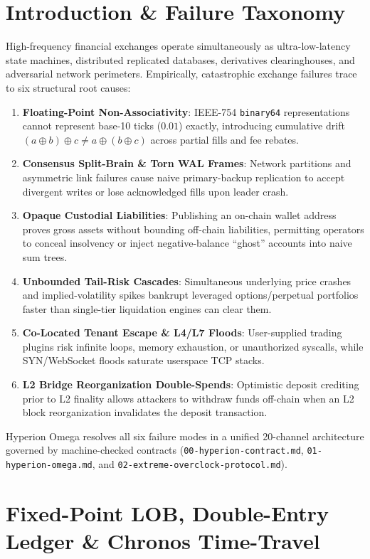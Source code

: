 \documentclass[10pt,twocolumn]{article}
\begin{document}
\section{Introduction \& Failure Taxonomy}
High-frequency financial exchanges operate simultaneously as ultra-low-latency state machines, distributed replicated databases, derivatives clearinghouses, and adversarial network perimeters. Empirically, catastrophic exchange failures trace to six structural root causes:
\begin{enumerate}
  \item \textbf{Floating-Point Non-Associativity}: IEEE-754 \texttt{binary64} representations cannot represent base-10 ticks ($0.01$) exactly, introducing cumulative drift $(a \oplus b) \oplus c \neq a \oplus (b \oplus c)$ across partial fills and fee rebates.
  \item \textbf{Consensus Split-Brain \& Torn WAL Frames}: Network partitions and asymmetric link failures cause naive primary-backup replication to accept divergent writes or lose acknowledged fills upon leader crash.
  \item \textbf{Opaque Custodial Liabilities}: Publishing an on-chain wallet address proves gross assets without bounding off-chain liabilities, permitting operators to conceal insolvency or inject negative-balance ``ghost'' accounts into naive sum trees.
  \item \textbf{Unbounded Tail-Risk Cascades}: Simultaneous underlying price crashes and implied-volatility spikes bankrupt leveraged options/perpetual portfolios faster than single-tier liquidation engines can clear them.
  \item \textbf{Co-Located Tenant Escape \& L4/L7 Floods}: User-supplied trading plugins risk infinite loops, memory exhaustion, or unauthorized syscalls, while SYN/WebSocket floods saturate userspace TCP stacks.
  \item \textbf{L2 Bridge Reorganization Double-Spends}: Optimistic deposit crediting prior to L2 finality allows attackers to withdraw funds off-chain when an L2 block reorganization invalidates the deposit transaction.
\end{enumerate}

Hyperion Omega resolves all six failure modes in a unified 20-channel architecture governed by machine-checked contracts (\texttt{00-hyperion-contract.md}, \texttt{01-hyperion-omega.md}, and \texttt{02-extreme-overclock-protocol.md}).

\section{Fixed-Point LOB, Double-Entry Ledger \& Chronos Time-Travel}
\end{document}
